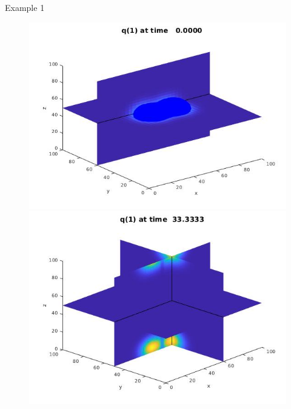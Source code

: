     

     \begin{frame}{Example 1}
    	\scriptsize
    	\begin{figure}[H]
    		\centering
    		\begin{minipage}{0.4\textwidth}
    			\includegraphics[scale=0.21]{Bilder_3D/2Glocken_wxi_wyj_wzi_2Cluster_t=0}
    		\end{minipage}
    		\hfill 
    		\begin{minipage}{0.4\textwidth}
    			\includegraphics[scale=0.21]{Bilder_3D/2Glocken_wxi_wyj_wzi_2Cluster_t=33}

\end{minipage}
\end{figure}
\end{frame}
